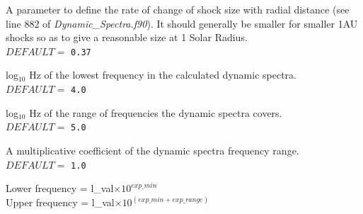 \documentclass[12pt,a4paper]{article}
\begin{document}
  \setlength{\temptextwidth}{\textwidth}   
  \addtolength{\temptextwidth}{-1.0\parindent} 
    
    \parbox[t]{\temptextwidth}{A parameter to define the rate of change 
                               of shock size with radial distance (see line 
                               882 of {\it Dynamic\_Spectra.f90}). It 
                               should generally be smaller for smaller 
                               1AU shocks so as to give a reasonable 
                               size at 1 Solar Radius. \\
                               $DEFAULT=$ {\tt 0.37}}

  \vspace{0.5cm}

  \setlength{\temptextwidth}{\textwidth}  
  \addtolength{\temptextwidth}{-1.0\parindent}   
    
    \parbox[t]{\temptextwidth}{log$_{10}$ Hz of the lowest frequency in the 
                               calculated dynamic spectra. \\ 
                               $DEFAULT=$ {\tt 4.0}}

  \vspace{0.5cm}

\newpage

  \setlength{\temptextwidth}{\textwidth}   
  \addtolength{\temptextwidth}{-1.0\parindent} 
   
    \parbox[t]{\temptextwidth}{log$_{10}$ Hz of the range of frequencies the
                               dynamic  spectra covers. \\
                               $DEFAULT=$ {\tt 5.0}}

  \vspace{0.5cm}

  \setlength{\temptextwidth}{\textwidth}  
  \addtolength{\temptextwidth}{-1.0\parindent} 
    
    \parbox[t]{\temptextwidth}{A multiplicative coefficient of the dynamic 
                               spectra frequency range. \\
                               $DEFAULT=$ {\tt 1.0}

                               Lower frequency = l\_val$\times 10^{exp\_min}$ \\ 
                               Upper frequency = l\_val$\times 10^{(exp\_min+exp\_range)}$}
\end{document}
